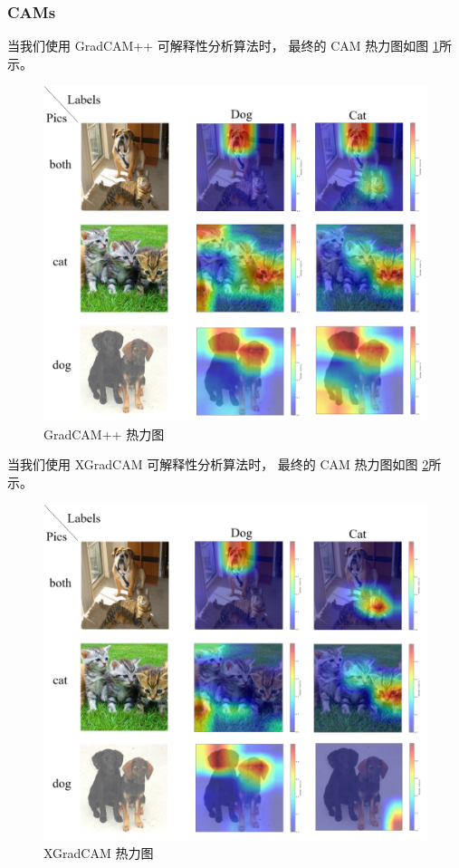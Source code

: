 \documentclass[supercite]{Experimental_Report}
\theoremstyle{definition}
\begin{document}
\subsubsection{CAMs}
当我们使用 GradCAM++ 可解释性分析算法时，
最终的 CAM 热力图如图 \ref{GradCAM++热力图}所示。
\begin{figure}[H]
	\begin{center}
		\includegraphics[scale=0.4]{../images/GradCAM++热力图.png}
		\caption{GradCAM++ 热力图}
		\label{GradCAM++热力图}
	\end{center}
\end{figure}

当我们使用 XGradCAM 可解释性分析算法时，
最终的 CAM 热力图如图 \ref{XGradCAM热力图}所示。
\begin{figure}[H]
	\begin{center}
		\includegraphics[scale=0.4]{../images/XGradCAM热力图.png}
		\caption{XGradCAM 热力图}
		\label{XGradCAM热力图}
	\end{center}
\end{figure}
\end{document}
